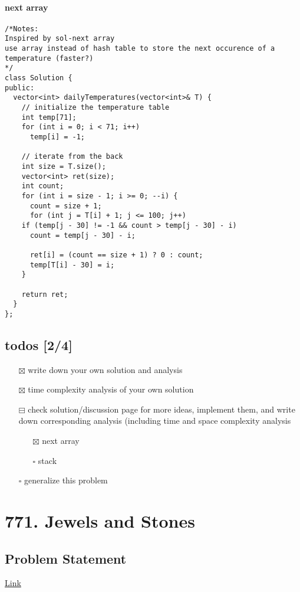 \documentclass[12pt]{article}
\begin{document}
\paragraph{next array}
\label{sec:orgf13e0f2}
\begin{verbatim}
/*Notes: 
Inspired by sol-next array
use array instead of hash table to store the next occurence of a temperature (faster?)
*/
class Solution {
public:
  vector<int> dailyTemperatures(vector<int>& T) {
    // initialize the temperature table
    int temp[71];
    for (int i = 0; i < 71; i++)
      temp[i] = -1;

    // iterate from the back
    int size = T.size();
    vector<int> ret(size);
    int count;
    for (int i = size - 1; i >= 0; --i) {
      count = size + 1;
      for (int j = T[i] + 1; j <= 100; j++)
	if (temp[j - 30] != -1 && count > temp[j - 30] - i)
	  count = temp[j - 30] - i;

      ret[i] = (count == size + 1) ? 0 : count;
      temp[T[i] - 30] = i;
    }

    return ret;
  }
};
\end{verbatim}
\subsection{todos [2/4]}
\label{sec:org43e29bd}
\begin{itemize}
\item[{$\boxtimes$}] write down your own solution and analysis
\item[{$\boxtimes$}] time complexity analysis of your own solution
\item[{$\boxminus$}] check solution/discussion page for more ideas, implement them, and write down corresponding analysis (including time and space complexity analysis
\begin{itemize}
\item[{$\boxtimes$}] next array
\item[{$\square$}] stack
\end{itemize}
\item[{$\square$}] generalize this problem
\end{itemize}
\section{771. Jewels and Stones}
\label{sec:org6c8268d}
\subsection{Problem Statement}
\label{sec:org5f2a2b4}
\href{https://leetcode.com/problems/jewels-and-stones/}{Link}
\end{document}

